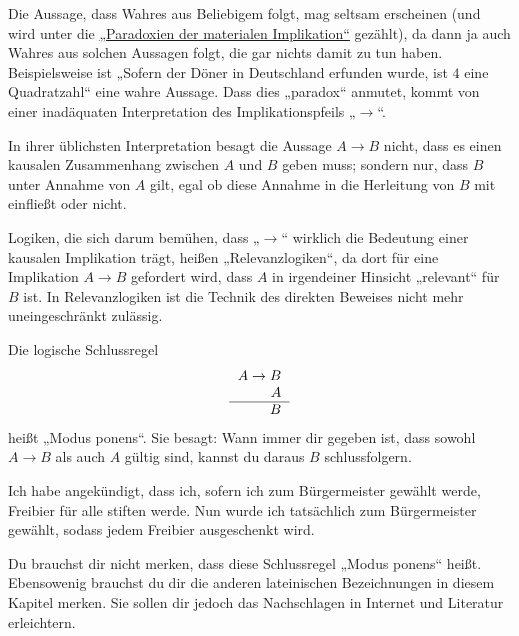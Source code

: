 \begin{bem} \label{keinekausalitaet}
    Die Aussage, dass Wahres aus Beliebigem folgt, mag seltsam erscheinen (und wird unter die \href{https://de.wikipedia.org/wiki/Paradoxien_der_materialen_Implikation}{„Paradoxien der materialen Implikation“} gezählt), da dann ja auch Wahres aus solchen Aussagen folgt, die gar nichts damit zu tun haben. Beispielsweise ist „Sofern der Döner in Deutschland erfunden wurde, ist $4$ eine Quadratzahl“ eine wahre Aussage. Dass dies „paradox“ anmutet, kommt von einer inadäquaten Interpretation des Implikationspfeils „$\to$“.
    
    In ihrer üblichsten Interpretation besagt die Aussage $A\to B$ nicht, dass es einen kausalen Zusammenhang zwischen $A$ und $B$ geben muss; sondern nur, dass $B$ unter Annahme von $A$ gilt, egal ob diese Annahme in die Herleitung von $B$ mit einfließt oder nicht.

    Logiken, die sich darum bemühen, dass „$\to$“ wirklich die Bedeutung einer kausalen Implikation trägt, heißen „Relevanzlogiken“, da dort für eine Implikation $A\to B$ gefordert wird, dass $A$ in irgendeiner Hinsicht „relevant“ für $B$ ist. In Relevanzlogiken ist die Technik des direkten Beweises nicht mehr uneingeschränkt zulässig.
\end{bem}


\begin{axiom} \label{modusponens} 
    Die logische Schlussregel
    \[\begin{tabular}{r}
        $A\to B$ \\
        $A$ \\
        \hline
        $B$
   \end{tabular}\]
    heißt „Modus ponens“. Sie besagt: Wann immer dir gegeben ist, dass sowohl $A\to B$ als auch $A$ gültig sind, kannst du daraus $B$ schlussfolgern.
\end{axiom}


\begin{bsp}
    Ich habe angekündigt, dass ich, sofern ich zum Bürgermeister gewählt werde, Freibier für alle stiften werde. Nun wurde ich tatsächlich zum Bürgermeister gewählt, sodass jedem Freibier ausgeschenkt wird.
\end{bsp}


\begin{bem}
    Du brauchst dir nicht merken, dass diese Schlussregel „Modus ponens“ heißt. Ebensowenig brauchst du dir die anderen lateinischen Bezeichnungen in diesem Kapitel merken. Sie sollen dir jedoch das Nachschlagen in Internet und Literatur erleichtern.
\end{bem}


